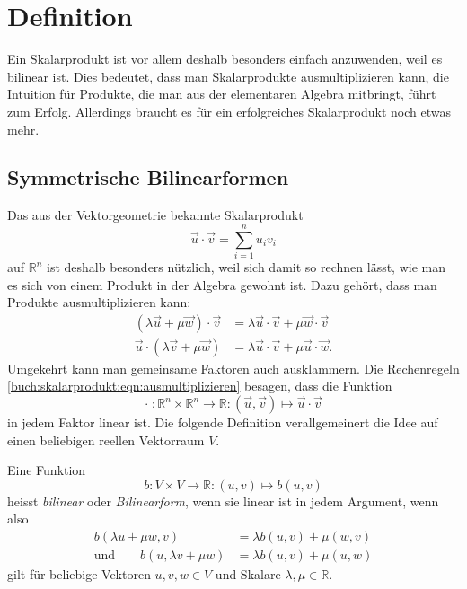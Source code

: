 %
%
%
\section{Definition
\label{buch:skalarprodukte:section:definition}}
Ein Skalarprodukt ist vor allem deshalb besonders einfach anzuwenden,
weil es bilinear ist.
Dies bedeutet, dass man Skalarprodukte ausmultiplizieren kann, die
Intuition für Produkte, die man aus der elementaren Algebra mitbringt,
führt zum Erfolg.
Allerdings braucht es für ein erfolgreiches Skalarprodukt noch
etwas mehr.

%
%
\subsection{Symmetrische Bilinearformen}
Das aus der Vektorgeometrie bekannte Skalarprodukt
%
%
\[
\vec{u}\cdot \vec{v}
=
\sum_{i=1}^n u_iv_i
\]
auf $\mathbb{R}^n$ ist deshalb besonders nützlich, weil sich damit
so rechnen lässt, wie man es sich von einem Produkt in der Algebra
gewohnt ist.
Dazu gehört, dass man Produkte ausmultiplizieren kann:
\begin{equation}
\begin{aligned}
(\lambda\vec{u}+\mu\vec{w})\cdot\vec{v}
&=
\lambda\vec{u}\cdot\vec{v}+\mu\vec{w}\cdot\vec{v}
\\
\vec{u}\cdot(\lambda\vec{v}+\mu\vec{w})
&=
\lambda\vec{u}\cdot\vec{v}+\mu\vec{u}\cdot\vec{w}.
\end{aligned}
\label{buch:skalarprodukt:eqn:ausmultiplizieren}
\end{equation}
Umgekehrt kann man gemeinsame Faktoren auch ausklammern.
Die Rechenregeln \eqref{buch:skalarprodukt:eqn:ausmultiplizieren}
besagen, dass die Funktion
\[
\cdot
\;
\colon
\mathbb{R}^n \times \mathbb{R}^n
\to
\mathbb{R}
:
(\vec{u},\vec{v}) \mapsto \vec{u}\cdot\vec{v}
\]
in jedem Faktor linear ist.
Die folgende Definition verallgemeinert die Idee auf einen
beliebigen reellen Vektorraum $V$.

\begin{definition}[bilinear]
Eine Funktion
\[
b\colon
V\times V \to \mathbb{R}
:
(u,v) \mapsto b(u,v)
\]
heisst {\em bilinear} oder {\em Bilinearform},
wenn sie linear ist in jedem Argument, wenn also
%
%
\[
\begin{aligned}
b(\lambda u+\mu w,v) &= \lambda b(u,v) + \mu(w,v)
\\
\text{und}\qquad
b(u,\lambda v+\mu w) &= \lambda b(u,v) + \mu(u,w)
\end{aligned}
\]
gilt für beliebige Vektoren $u,v,w\in V$ und Skalare
$\lambda,\mu\in\mathbb{R}$.
\end{definition}

